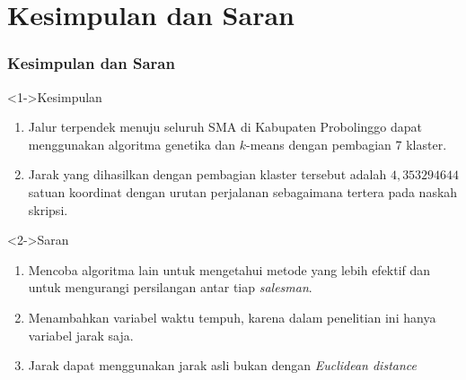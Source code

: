 \section{Kesimpulan dan Saran}
\begin{frame}
\frametitle{Kesimpulan dan Saran}

\begin{block}<1->{Kesimpulan}
\begin{enumerate}
\item Jalur terpendek menuju seluruh SMA di Kabupaten Probolinggo dapat menggunakan algoritma genetika dan $k$-means dengan pembagian 7 klaster.
\item Jarak yang dihasilkan dengan pembagian klaster tersebut adalah $4,353294644$ satuan koordinat dengan urutan perjalanan sebagaimana tertera pada naskah skripsi.
\end{enumerate}
\end{block}

\begin{block}<2->{Saran}
\begin{enumerate}
\item Mencoba algoritma lain untuk mengetahui metode yang lebih efektif dan untuk mengurangi persilangan antar tiap \textit{salesman}.
\item Menambahkan variabel waktu tempuh, karena dalam penelitian ini hanya variabel jarak saja.
\item Jarak dapat menggunakan jarak asli bukan dengan \textit{Euclidean distance}
\end{enumerate}
\end{block}
\end{frame}